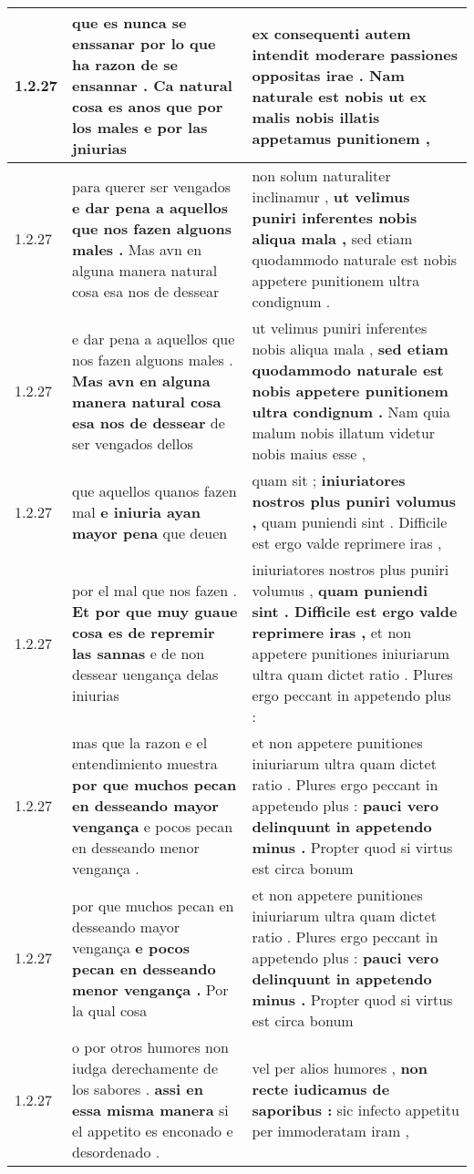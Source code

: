 \begin{tabular}{|p{1cm}|p{6.5cm}|p{6.5cm}|}
1.2.27 & que es nunca se enssanar \textbf{ por lo que ha razon de se ensannar . Ca natural cosa es anos } que por los males e por las jniurias & ex consequenti autem intendit moderare passiones oppositas irae . \textbf{ Nam naturale est nobis } ut ex malis nobis illatis appetamus punitionem , \\\hline
1.2.27 & para querer ser vengados \textbf{ e dar pena a aquellos que nos fazen alguons males . } Mas avn en alguna manera natural cosa esa nos de dessear & non solum naturaliter inclinamur , \textbf{ ut velimus puniri inferentes nobis aliqua mala , } sed etiam quodammodo naturale est nobis appetere punitionem ultra condignum . \\\hline
1.2.27 & e dar pena a aquellos que nos fazen alguons males . \textbf{ Mas avn en alguna manera natural cosa esa nos de dessear } de ser vengados dellos & ut velimus puniri inferentes nobis aliqua mala , \textbf{ sed etiam quodammodo naturale est nobis appetere punitionem ultra condignum . } Nam quia malum nobis illatum videtur nobis maius esse , \\\hline
1.2.27 & que aquellos quanos fazen mal \textbf{ e iniuria ayan mayor pena } que deuen & quam sit ; \textbf{ iniuriatores nostros plus puniri volumus , } quam puniendi sint . Difficile est ergo valde reprimere iras , \\\hline
1.2.27 & por el mal que nos fazen . \textbf{ Et por que muy guaue cosa es de repremir las sannas } e de non dessear uengança delas iniurias & iniuriatores nostros plus puniri volumus , \textbf{ quam puniendi sint . Difficile est ergo valde reprimere iras , } et non appetere punitiones iniuriarum ultra quam dictet ratio . Plures ergo peccant in appetendo plus : \\\hline
1.2.27 & mas que la razon e el entendimiento muestra \textbf{ por que muchos pecan en desseando mayor vengança } e pocos pecan en desseando menor vengança . & et non appetere punitiones iniuriarum ultra quam dictet ratio . Plures ergo peccant in appetendo plus : \textbf{ pauci vero delinquunt in appetendo minus . } Propter quod si virtus est circa bonum \\\hline
1.2.27 & por que muchos pecan en desseando mayor vengança \textbf{ e pocos pecan en desseando menor vengança . } Por la qual cosa & et non appetere punitiones iniuriarum ultra quam dictet ratio . Plures ergo peccant in appetendo plus : \textbf{ pauci vero delinquunt in appetendo minus . } Propter quod si virtus est circa bonum \\\hline
1.2.27 & o por otros humores non iudga derechamente de los sabores . \textbf{ assi en essa misma manera } si el appetito es enconado e desordenado . & vel per alios humores , \textbf{ non recte iudicamus de saporibus : } sic infecto appetitu per immoderatam iram , \\\hline

\end{tabular}
